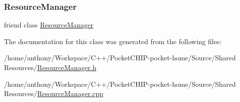 \subsubsection{\texorpdfstring{Resource\+Manager}{ResourceManager}}
{\footnotesize\ttfamily friend class \mbox{\hyperlink{classResourceManager}{Resource\+Manager}}\hspace{0.3cm}{\ttfamily [friend]}}



The documentation for this class was generated from the following files\+:\begin{DoxyCompactItemize}
\item 
/home/anthony/\+Workspace/\+C++/\+Pocket\+C\+H\+I\+P-\/pocket-\/home/\+Source/\+Shared Resources/\mbox{\hyperlink{ResourceManager_8h}{Resource\+Manager.\+h}}\item 
/home/anthony/\+Workspace/\+C++/\+Pocket\+C\+H\+I\+P-\/pocket-\/home/\+Source/\+Shared Resources/\mbox{\hyperlink{ResourceManager_8cpp}{Resource\+Manager.\+cpp}}\end{DoxyCompactItemize}
